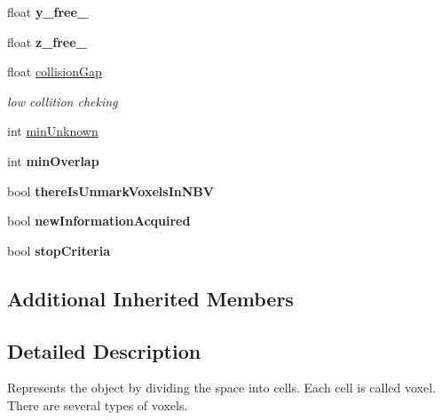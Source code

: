 \begin{DoxyCompactItemize}
\item 
float {\bfseries y\+\_\+free\+\_}\hypertarget{classPMVolumetric_acff18696bf72b370be1581cab638149e}{}\label{classPMVolumetric_acff18696bf72b370be1581cab638149e}

\item 
float {\bfseries z\+\_\+free\+\_}\hypertarget{classPMVolumetric_a180652dad0bcc762e6b1f32eaae366f3}{}\label{classPMVolumetric_a180652dad0bcc762e6b1f32eaae366f3}

\item 
float \hyperlink{classPMVolumetric_abc325af8fdaf1500864e9ee60262d775}{collision\+Gap}\hypertarget{classPMVolumetric_abc325af8fdaf1500864e9ee60262d775}{}\label{classPMVolumetric_abc325af8fdaf1500864e9ee60262d775}

\begin{DoxyCompactList}\small\item\em low collition cheking \end{DoxyCompactList}\item 
int \hyperlink{classPMVolumetric_aa5b2eec9334daa96bb23677c28b7642a}{min\+Unknown}
\item 
int {\bfseries min\+Overlap}\hypertarget{classPMVolumetric_aba67bf40df276a9a35cf5fbb4868d7fe}{}\label{classPMVolumetric_aba67bf40df276a9a35cf5fbb4868d7fe}

\item 
bool {\bfseries there\+Is\+Unmark\+Voxels\+In\+N\+BV}\hypertarget{classPMVolumetric_a38188f142b169375df1df9601b5eb43b}{}\label{classPMVolumetric_a38188f142b169375df1df9601b5eb43b}

\item 
bool {\bfseries new\+Information\+Acquired}\hypertarget{classPMVolumetric_a552872963d57adcef3fbdddb59b1581e}{}\label{classPMVolumetric_a552872963d57adcef3fbdddb59b1581e}

\item 
bool {\bfseries stop\+Criteria}\hypertarget{classPMVolumetric_a92ce6ac7149fdc24b38dc4ceb50a8cc8}{}\label{classPMVolumetric_a92ce6ac7149fdc24b38dc4ceb50a8cc8}

\end{DoxyCompactItemize}
\subsection*{Additional Inherited Members}


\subsection{Detailed Description}
Represents the object by dividing the space into cells. Each cell is called voxel. There are several types of voxels. 

